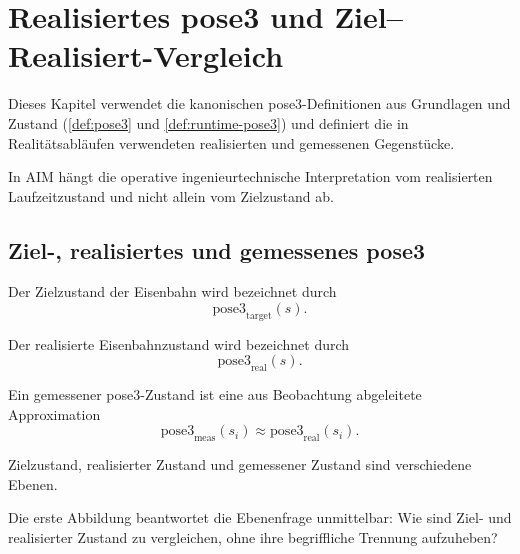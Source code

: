 \chapter{Realisiertes pose3 und Ziel--Realisiert-Vergleich}
\label{chap:realized-pose3}

Dieses Kapitel verwendet die kanonischen pose3-Definitionen aus Grundlagen
und Zustand (\cref{def:pose3} und \cref{def:runtime-pose3}) und definiert die in
Realitätsabläufen verwendeten realisierten und gemessenen Gegenstücke.

\begin{principle}
\label{princ:realized-state-principle}
In AIM hängt die operative ingenieurtechnische Interpretation vom realisierten
Laufzeitzustand und nicht allein vom Zielzustand ab.
\end{principle}

\section{Ziel-, realisiertes und gemessenes pose3}

\begin{definition}
\label{def:target-pose3}
Der Zielzustand der Eisenbahn wird bezeichnet durch
\[
\mathrm{pose3}_{\mathrm{target}}(s).
\]
\end{definition}

\begin{definition}
\label{def:realized-pose3}
Der realisierte Eisenbahnzustand wird bezeichnet durch
\[
\mathrm{pose3}_{\mathrm{real}}(s).
\]
\end{definition}

\begin{definition}
\label{def:measured-pose3}
Ein gemessener pose3-Zustand ist eine aus Beobachtung abgeleitete Approximation
\[
\mathrm{pose3}_{\mathrm{meas}}(s_i)
\approx
\mathrm{pose3}_{\mathrm{real}}(s_i).
\]
\end{definition}

\begin{principle}
\label{princ:measurement-separation}
Zielzustand, realisierter Zustand und gemessener Zustand sind verschiedene
Ebenen.
\end{principle}

Die erste Abbildung beantwortet die Ebenenfrage unmittelbar: Wie sind Ziel-
und realisierter Zustand zu vergleichen, ohne ihre begriffliche Trennung
aufzuheben?

